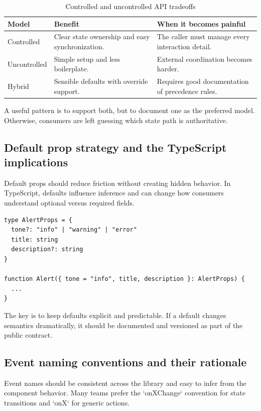 \begin{table}[htbp]
  \centering
  \caption{Controlled and uncontrolled API tradeoffs}
  \begin{tabularx}{\textwidth}{@{}p{}p{}Y@{}}
    \toprule
    \textbf{Model} & \textbf{Benefit} & \textbf{When it becomes painful} \\
    \midrule
    Controlled & Clear state ownership and easy synchronization. & The caller must manage every interaction detail. \\
    Uncontrolled & Simple setup and less boilerplate. & External coordination becomes harder. \\
    Hybrid & Sensible defaults with override support. & Requires good documentation of precedence rules. \\
    \bottomrule
  \end{tabularx}
\end{table}

A useful pattern is to support both, but to document one as the preferred model. Otherwise, consumers are left guessing which state path is authoritative.

\subsection{Default prop strategy and the TypeScript implications}
Default props should reduce friction without creating hidden behavior. In TypeScript, defaults influence inference and can change how consumers understand optional versus required fields.

\begin{verbatim}
type AlertProps = {
  tone?: "info" | "warning" | "error"
  title: string
  description?: string
}

function Alert({ tone = "info", title, description }: AlertProps) {
  ...
}
\end{verbatim}

The key is to keep defaults explicit and predictable. If a default changes semantics dramatically, it should be documented and versioned as part of the public contract.

\subsection{Event naming conventions and their rationale}
Event names should be consistent across the library and easy to infer from the component behavior. Many teams prefer the `onXChange` convention for state transitions and `onX` for generic actions.

